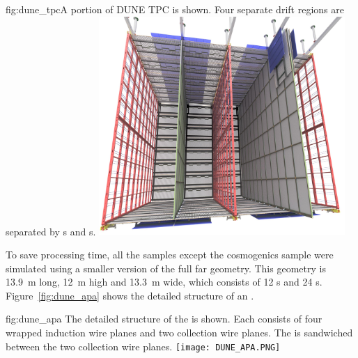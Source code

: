 \begin{dunefigure}{fig:dune_tpc}{A portion of DUNE \single TPC is shown. Four separate drift regions are separated by s and s.}
\includegraphics[width=0.7\textwidth]{graphics/dune_sp_fd.jpg}
\end{dunefigure}

To save processing time, all the  samples except the cosmogenics sample were simulated using a smaller version of the full \nominalmodsize far  geometry. This geometry is \SI{13.9}{m} long, \SI{12}{m} high and \SI{13.3}{m} wide, which consists of 12 s and 24 s. %
Figure~\ref{fig:dune_apa} shows the detailed structure of an . %
\begin{dunefigure}
{fig:dune_apa}
{The detailed structure of the  is shown. Each  consists of four wrapped induction wire planes and two collection wire planes.
The  is sandwiched between the two collection wire planes.}
\texttt{[image: DUNE\_APA.PNG]}
\end{dunefigure}


